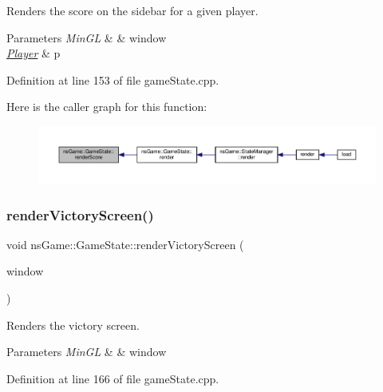 Renders the score on the sidebar for a given player. 


\begin{DoxyParams}{Parameters}
{\em Min\+GL} & \& window \\
\hline
{\em \hyperlink{classns_game_1_1_player}{Player}} & p \\
\hline
\end{DoxyParams}


Definition at line 153 of file game\+State.\+cpp.

Here is the caller graph for this function\+:\nopagebreak
\begin{figure}[H]
\begin{center}
\leavevmode
\includegraphics[width=350pt]{classns_game_1_1_game_state_a8d9cadd7432dfd4b7ada08e37bf6b30d_icgraph}
\end{center}
\end{figure}
\mbox{\label{classns_game_1_1_game_state_a66f328c56ed9887e02a93db856316d4c}} 
\subsubsection{\texorpdfstring{render\+Victory\+Screen()}{renderVictoryScreen()}}
{\footnotesize\ttfamily void ns\+Game\+::\+Game\+State\+::render\+Victory\+Screen (\begin{DoxyParamCaption}\item[{Min\+GL \&}]{window }\end{DoxyParamCaption})}



Renders the victory screen. 


\begin{DoxyParams}{Parameters}
{\em Min\+GL} & \& window \\
\hline
\end{DoxyParams}


Definition at line 166 of file game\+State.\+cpp.

